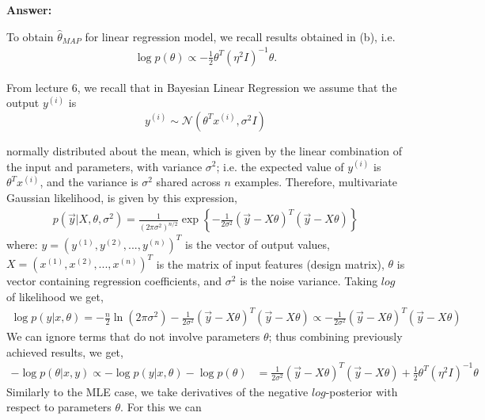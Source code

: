 \documentclass{article}
\begin{document}
\begin{enumerate}
\textbf{Answer:}

To obtain $\hat{\theta}_{MAP}$ for linear regression model, we recall results obtained in (b), i.e.
 \begin{align*}
     \log p(\theta) \propto   - \frac{1}{2} \theta^T (\eta^2I)^{-1} \theta.
\end{align*}

From lecture 6, we recall that in Bayesian Linear Regression we assume that the output 
$y^{(i)}$ is
\[
y^{(i)} \sim \mathcal{N}(\theta^Tx^{(i)}, \sigma^2 I)
\]


normally distributed about the mean, which is given by the linear combination of the input and parameters, with variance $\sigma^2$; i.e. the expected value of $y^{(i)}$ is $\theta^Tx^{(i)}$, and the variance is $\sigma^2$ shared across $n$ examples. Therefore, multivariate Gaussian likelihood, is given by this expression,
\begin{align*}
    p(\vec{y}|X, \theta, \sigma^2) = \frac{1}{(2\pi\sigma^2)^{n/2}} \exp\left\{-\frac{1}{2\sigma^2} (\vec{y} - X\theta)^T (\vec{y} - X\theta)\right\}
\end{align*}
where: $y = (y^{(1)}, y^{(2)}, ..., y^{(n)})^T$ is the vector of output values, $X = (x^{(1)}, x^{(2)}, ..., x^{(n)})^T$ is the matrix of input features (design matrix), $\theta$ is vector containing regression coefficients, and $\sigma^2$ is the noise variance. Taking $log$ of likelihood we get,
\begin{align*}
    \log p(y|x,\theta) = -\frac{n}{2}\ln(2\pi\sigma^2) - \frac{1}{2\sigma^2} (\vec{y} - X\theta)^T (\vec{y} - X\theta)\propto - \frac{1}{2\sigma^2} (\vec{y} - X\theta)^T (\vec{y} - X\theta)
\end{align*}
We can ignore terms that do not involve parameters $\theta$; thus combining previously achieved results, we get,
\begin{align*}
-\log p(\theta|x,y) \propto -\log p(y|x,\theta) -  \log p(\theta)& = \frac{1}{2\sigma^2} (\vec{y} - X\theta)^T (\vec{y} - X\theta) + \frac{1}{2} \theta^T (\eta^2I)^{-1} \theta %
\end{align*}
 Similarly to the MLE case, we take derivatives of the negative $log$-posterior with respect to parameters $\theta$. For this we can  

\end{enumerate}
\end{document}
